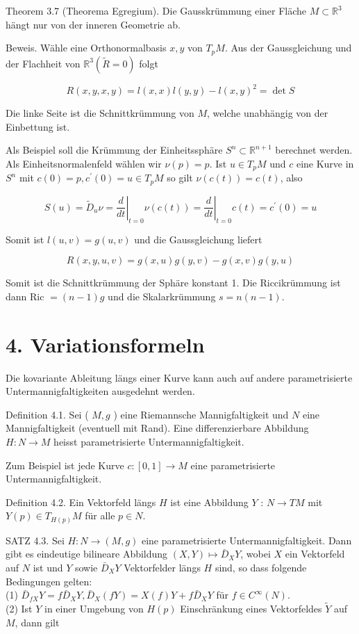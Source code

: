 \documentclass[10pt]{article}
\begin{document}
Theorem 3.7 (Theorema Egregium). Die Gausskrümmung einer Fläche $M \subset \mathbb{R}^{3}$ hängt nur von der inneren Geometrie ab.

Beweis. Wähle eine Orthonormalbasis $x, y$ von $T_{p} M$. Aus der Gaussgleichung und der Flachheit von $\mathbb{R}^{3}(\tilde{R}=0)$ folgt

$$
R(x, y, x, y)=l(x, x) l(y, y)-l(x, y)^{2}=\operatorname{det} S
$$

Die linke Seite ist die Schnittkrümmung von $M$, welche unabhängig von der Einbettung ist.

Als Beispiel soll die Krümmung der Einheitssphäre $S^{n} \subset \mathbb{R}^{n+1}$ berechnet werden. Als Einheitsnormalenfeld wählen wir $\nu(p)=p$. Ist $u \in T_{p} M$ und $c$ eine Kurve in $S^{n}$ mit $c(0)=p, c^{\prime}(0)=u \in T_{p} M$ so gilt $\nu(c(t))=c(t)$, also

$$
S(u)=\tilde{D}_{u} \nu=\left.\frac{d}{d t}\right|_{t=0} \nu(c(t))=\left.\frac{d}{d t}\right|_{t=0} c(t)=c^{\prime}(0)=u
$$

Somit ist $l(u, v)=g(u, v)$ und die Gaussgleichung liefert

$$
R(x, y, u, v)=g(x, u) g(y, v)-g(x, v) g(y, u)
$$

Somit ist die Schnittkrümmung der Sphäre konstant 1. Die Riccikrümmung ist dann Ric $=(n-1) g$ und die Skalarkrümmung $s=n(n-1)$.

\section*{4. Variationsformeln}
Die kovariante Ableitung längs einer Kurve kann auch auf andere parametrisierte Untermannigfaltigkeiten ausgedehnt werden.

Definition 4.1. Sei ( $M, g$ ) eine Riemannsche Mannigfaltigkeit und $N$ eine Mannigfaltigkeit (eventuell mit Rand). Eine differenzierbare Abbildung $H: N \rightarrow M$ heisst parametrisierte Untermannigfaltigkeit.

Zum Beispiel ist jede Kurve $c:[0,1] \rightarrow M$ eine parametrisierte Untermannigfaltigkeit.

Definition 4.2. Ein Vektorfeld längs $H$ ist eine Abbildung $Y$ : $N \rightarrow T M$ mit $Y(p) \in T_{H(p)} M$ für alle $p \in N$.

SATZ 4.3. Sei $H: N \rightarrow(M, g)$ eine parametrisierte Untermannigfaltigkeit. Dann gibt es eindeutige bilineare Abbildung $(X, Y) \mapsto \bar{D}_{X} Y$, wobei $X$ ein Vektorfeld auf $N$ ist und $Y$ sowie $\bar{D}_{X} Y$ Vektorfelder längs $H$ sind, so dass folgende Bedingungen gelten:\\
(1) $\bar{D}_{f X} Y=f \bar{D}_{X} Y, \bar{D}_{X}(f Y)=X(f) Y+f \bar{D}_{X} Y$ für $f \in C^{\infty}(N)$.\\
(2) Ist $Y$ in einer Umgebung von $H(p)$ Einschränkung eines Vektorfeldes $\tilde{Y}$ auf $M$, dann gilt
\end{document}
